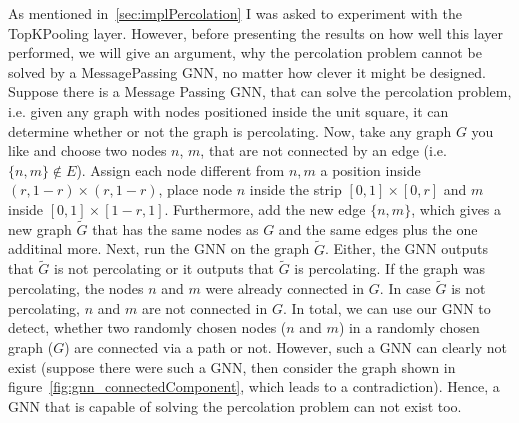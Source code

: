 As mentioned in~\ref{sec:implPercolation} I was asked to experiment with the TopKPooling layer. 
However, before presenting the results on how well this layer performed, we will give an argument, why the percolation problem 
cannot be solved by a MessagePassing GNN, no matter how clever it might be designed.
Suppose there is a Message Passing GNN, that can solve the percolation problem, i.e. given any graph 
with nodes positioned inside the unit square, it can determine whether or not the graph is percolating. 
Now, take any graph $G$ you like and choose two nodes $n$, $m$, that are not connected by an edge (i.e. $\{n,m\}\notin E$). 
Assign each node different from $n, m$ a position inside 
$(r, 1-r)\times(r, 1-r)$, place node $n$ inside the strip $[0,1]\times [0,r]$ and $m$ inside $[0,1]\times[1-r, 1]$. 
Furthermore, add the new edge $\{n,m\}$, which gives a new graph $\tilde{G}$ that has the same nodes
as $G$ and the same edges plus the one additinal more. Next, run the GNN on the graph $\tilde{G}$. 
Either, the GNN outputs that $\tilde{G}$ is not percolating or it outputs that $\tilde{G}$ is percolating. 
If the graph was percolating, the nodes $n$ and $m$ were already connected in $G$. 
In case $\tilde{G}$ is not percolating, $n$ and $m$ are not connected in $G$. 
In total, we can use our GNN to detect, whether two randomly chosen nodes ($n$ and $m$) in a randomly 
chosen graph ($G$) are connected via a path or not.
However, such a GNN can clearly not exist (suppose there were such a GNN, 
then consider the graph shown in figure~\ref{fig:gnn_connectedComponent}, which leads to
a contradiction).
Hence, a GNN that is capable of solving the percolation problem can not exist too.
